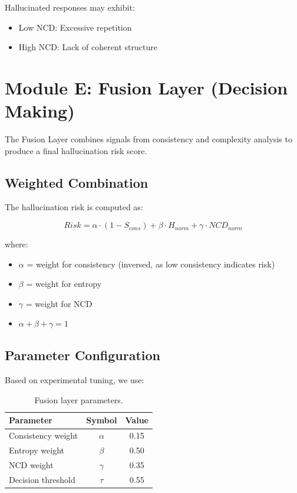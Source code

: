 Hallucinated responses may exhibit:
\begin{itemize}
    \item Low NCD: Excessive repetition
    \item High NCD: Lack of coherent structure
\end{itemize}

\section{Module E: Fusion Layer (Decision Making)}

The Fusion Layer combines signals from consistency and complexity analysis to produce a final hallucination risk score.

\subsection{Weighted Combination}

The hallucination risk is computed as:

\begin{equation}
    Risk = \alpha \cdot (1 - S_{cons}) + \beta \cdot H_{norm} + \gamma \cdot NCD_{norm}
\end{equation}

where:
\begin{itemize}
    \item $\alpha$ = weight for consistency (inversed, as low consistency indicates risk)
    \item $\beta$ = weight for entropy
    \item $\gamma$ = weight for NCD
    \item $\alpha + \beta + \gamma = 1$
\end{itemize}

\subsection{Parameter Configuration}

Based on experimental tuning, we use:

\begin{table}[!htbp]
    \centering
    \caption{Fusion layer parameters.}
    \label{tab:params}
    \begin{tabular}{lcc}
        \toprule
        Parameter & Symbol & Value \\
        \midrule
        Consistency weight & $\alpha$ & 0.15 \\
        Entropy weight & $\beta$ & 0.50 \\
        NCD weight & $\gamma$ & 0.35 \\
        Decision threshold & $\tau$ & 0.55 \\
        \bottomrule
    \end{tabular}
\end{table}

